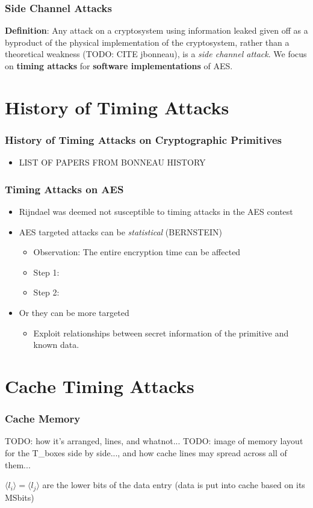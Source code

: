 \documentclass[8pt,handout]{beamer}
\begin{document}
\begin{frame}
	\frametitle{Side Channel Attacks}
	\textbf{Definition}: Any attack on a cryptosystem using information leaked given off as a byproduct of the physical implementation of the cryptosystem, rather than a theoretical weakness (TODO: CITE jbonneau), is a \emph{side channel attack}.
	\medskip
	We focus on \textbf{timing attacks} for \textbf{software implementations} of AES.
\end{frame}

\section{History of Timing Attacks}
\begin{frame}
	\frametitle{History of Timing Attacks on Cryptographic Primitives}
	\begin{itemize}
		\item LIST OF PAPERS FROM BONNEAU HISTORY
	\end{itemize}
\end{frame}

\begin{frame}
	\frametitle{Timing Attacks on AES}
	\begin{itemize}
		\item Rijndael was deemed not susceptible to timing attacks in the AES contest
		\item AES targeted attacks can be \emph{statistical} (BERNSTEIN)
		\begin{itemize}
			\item Observation: The entire encryption time can be affected
			\item Step 1: 
			\item Step 2: 
		\end{itemize}
		\item Or they can be more targeted
		\begin{itemize}
			\item Exploit relationships between secret information of the primitive and known data.
		\end{itemize}
	\end{itemize}
\end{frame}

\section{Cache Timing Attacks}
\begin{frame}
	\frametitle{Cache Memory}
	TODO: how it's arranged, lines, and whatnot...
	TODO: image of memory layout for the T\_boxes side by side..., and how cache lines may spread across all of them...

$\langle l_i \rangle = \langle l_j \rangle$ are the lower bits of the data entry (data is put into cache based on its MSbits)
\end{frame}
\end{document}
